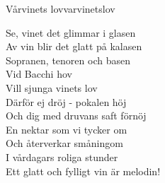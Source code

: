 \begin{song}{Vårvinets lov}{varvinetslov}
\begin{vers}
Se, vinet det glimmar i glasen\\
Av vin blir det glatt på kalasen\\
Sopranen, tenoren och basen\\
Vid Bacchi hov\\
Vill sjunga vinets lov\\
Därför ej dröj - pokalen höj\\
Och dig med druvans saft förnöj\\
En nektar som vi tycker om\\
Och återverkar småningom\\
I vårdagars roliga stunder\\
Ett glatt och fylligt vin är melodin!\\
\end{vers}
\end{song}
